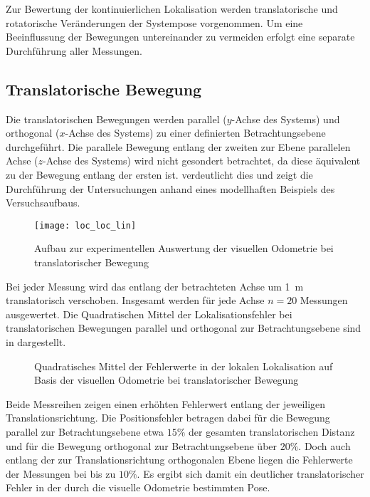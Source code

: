 Zur Bewertung der kontinuierlichen Lokalisation werden translatorische und rotatorische Veränderungen der Systempose vorgenommen. Um eine Beeinflussung der Bewegungen untereinander zu vermeiden erfolgt eine separate Durchführung aller Messungen.\\

\subsection{Translatorische Bewegung}
Die translatorischen Bewegungen werden parallel ($y$-Achse des Systems) und orthogonal ($x$-Achse des Systems) zu einer definierten Betrachtungsebene durchgeführt. Die parallele Bewegung entlang der zweiten zur Ebene parallelen Achse ($z$-Achse des Systems) wird nicht gesondert betrachtet, da diese äquivalent zu der Bewegung entlang der ersten ist.  verdeutlicht dies und zeigt die Durchführung der Untersuchungen anhand eines modellhaften Beispiels des Versuchsaufbaus.\\

\begin{figure}[!ht]
	\begin{center}
		\texttt{[image: loc\_loc\_lin]}
		\caption{Aufbau zur experimentellen Auswertung der visuellen Odometrie bei translatorischer Bewegung}
		\label{fig.transmove}
	\end{center}
\end{figure}

Bei jeder Messung wird das \kps{} entlang der betrachteten Achse um \SI{1}{\meter} translatorisch verschoben. Insgesamt werden für jede Achse $n=20$ Messungen ausgewertet. Die Quadratischen Mittel der Lokalisationsfehler bei translatorischen Bewegungen parallel und orthogonal zur Betrachtungsebene sind in  dargestellt.

\begin{figure}[!ht]

\caption{Quadratisches Mittel der Fehlerwerte in der lokalen Lokalisation auf Basis der visuellen Odometrie bei translatorischer Bewegung}
\label{fig.loc_loc_trans}
\end{figure}

\vspace{5mm}

Beide Messreihen zeigen einen erhöhten Fehlerwert entlang der jeweiligen Translationsrichtung. Die Positionsfehler betragen dabei für die Bewegung parallel zur Betrachtungsebene etwa $15\%$ der gesamten translatorischen Distanz und für die Bewegung orthogonal zur Betrachtungsebene über $20\%$. Doch auch entlang der zur Translationsrichtung orthogonalen Ebene liegen die Fehlerwerte der Messungen bei bis zu $10\%$. Es ergibt sich damit ein deutlicher translatorischer Fehler in der durch die visuelle Odometrie bestimmten Pose.\\

